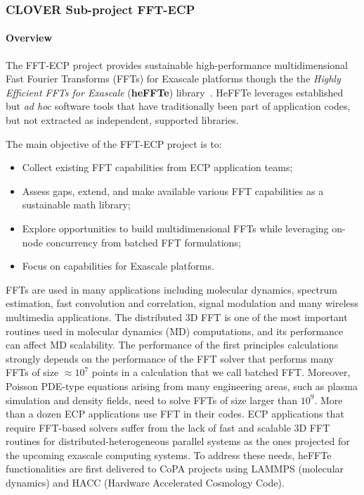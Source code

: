 \subsubsection{ CLOVER Sub-project FFT-ECP}\label{subsubsect:fftecp}


\paragraph{Overview}

The FFT-ECP project provides sustainable high-performance multidimensional
Fast Fourier Transforms (FFTs) for Exascale platforms though the
the {\it Highly Efficient FFTs for Exascale} ({\bf heFFTe}) library~\cite{thasd19}.
HeFFTe leverages established but {\it ad hoc} 
software tools that have traditionally been part of application 
codes, but not extracted as independent, supported libraries. 

The main objective of the FFT-ECP project is to:
\begin{itemize}
\item Collect existing FFT capabilities from ECP 
      application teams;
\item Assess gaps, extend, and make available various FFT
      capabilities as a sustainable math library;
\item Explore opportunities to build multidimensional FFTs
      while leveraging on-node concurrency from 
      batched FFT formulations;
\item Focus on capabilities for Exascale platforms.
\end{itemize}

FFTs are used in many applications including molecular dynamics, 
spectrum estimation, fast convolution and correlation, signal 
modulation and many wireless multimedia applications. The 
distributed 3D FFT is one of the most important routines used 
in molecular dynamics (MD) computations, and its performance can 
affect MD scalability. The performance of the first 
principles calculations strongly depends on the performance of the 
FFT solver that performs many FFTs of size $\approx 10^7$ points in 
a calculation that we call batched FFT. Moreover, Poisson PDE-type 
equations arising from many engineering areas, such as plasma
simulation and density fields, need to solve FFTs of size larger than $10^9$. 
%
More than a dozen ECP applications use FFT in their codes.
ECP applications that require FFT-based solvers suffer from the lack of 
fast and scalable 3D FFT routines for distributed-heterogeneous parallel 
systems as the ones projected for the upcoming exascale computing systems. 
To address these needs, heFFTe functionalities are first delivered 
to CoPA projects using LAMMPS (molecular dynamics) and HACC (Hardware Accelerated
Cosmology Code).

